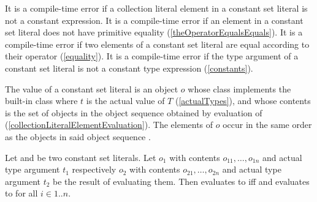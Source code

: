 \documentclass[makeidx]{article}
\begin{document}
{

\LMHash{}%
It is a compile-time error if
a collection literal element in a constant set literal
is not a constant expression.
It is a compile-time error if
an element in a constant set literal
does not have primitive equality
(\ref{theOperatorEqualsEquals}).
It is a compile-time error if two elements of a constant set literal are equal
according to their \lit{==} operator
(\ref{equality}).
It is a compile-time error if the type argument of a constant set literal
is not a constant type expression
(\ref{constants}).


\LMHash{}%
The value of a constant set literal
is an object $o$ whose class implements the built-in class
where $t$ is the actual value of $T$
(\ref{actualTypes}),
and whose contents is the set of objects in
the object sequence  obtained by
evaluation of 
(\ref{collectionLiteralElementEvaluation}).
The elements of $o$ occur in the same order as
the objects in said object sequence
.

\LMHash{}%
Let 
and 
be two constant set literals.
Let $o_1$ with contents $o_{11}, \ldots, o_{1n}$ and actual type argument $t_1$
respectively
$o_2$ with contents $o_{21}, \ldots, o_{2n}$ and actual type argument $t_2$
be the result of evaluating them.
Then  evaluates to \TRUE{} if{}f
 and 
evaluates to \TRUE{} for all $i \in 1 .. n$.


}
\end{document}
